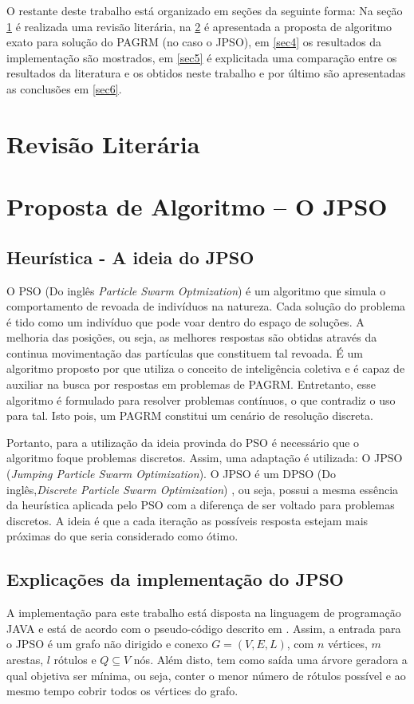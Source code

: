 \documentclass{sig-alternate-05-2015}
\begin{document}
O restante deste trabalho está organizado em seções da seguinte forma: Na seção \ref{sec2} é realizada uma revisão literária, na \ref{sec3} é apresentada a proposta de algoritmo exato para solução do PAGRM (no caso o JPSO), em \ref{sec4} os resultados da implementação são mostrados, em \ref{sec5} é explicitada uma comparação entre os resultados da literatura e os obtidos neste trabalho e por último são apresentadas as conclusões em \ref{sec6}.



\section{Revisão Literária} \label{sec2}


\section{Proposta de Algoritmo -- O JPSO} \label{sec3}

\subsection{Heurística - A ideia do JPSO}

O PSO (Do inglês \textit{Particle Swarm Optmization}) é um algoritmo que simula o comportamento de revoada de indivíduos na natureza. Cada solução do problema  é tido como um indivíduo que pode voar dentro do espaço de soluções. A melhoria das posições, ou seja, as melhores respostas são obtidas através da continua movimentação das partículas que constituem tal revoada. É um algoritmo proposto por \cite{} que utiliza o conceito de inteligência coletiva e é capaz de auxiliar na busca por respostas em problemas de PAGRM. Entretanto, esse algoritmo é formulado para resolver problemas contínuos, o que contradiz o uso para tal. Isto pois, um PAGRM constitui um cenário de resolução discreta.


Portanto, para a utilização da ideia provinda do PSO  é necessário que o algoritmo foque problemas discretos. Assim, uma adaptação é utilizada: O JPSO (\textit{Jumping Particle Swarm Optimization}).
O JPSO  é um DPSO (Do inglês,\textit{Discrete Particle Swarm Optimization}) \cite{} , ou seja, possui 
a mesma essência da heurística aplicada pelo PSO com a diferença de ser voltado para problemas discretos. A ideia é que a cada iteração as possíveis resposta estejam mais próximas do que seria considerado como ótimo. 

\subsection{Explicações da implementação do JPSO}
A implementação para este trabalho está disposta na linguagem de programação JAVA  e está de acordo com o pseudo-código descrito em \cite{}. Assim, a entrada para o JPSO é um grafo não dirigido e conexo $G = (V,E,L)$, com $n$ vértices, 	$m$ arestas, $l$ rótulos e $Q \subseteq V$ nós. Além disto, tem como saída uma árvore geradora a qual objetiva ser mínima, ou seja, conter o menor número de rótulos possível e ao mesmo tempo cobrir todos os vértices do grafo. 
\end{document}
